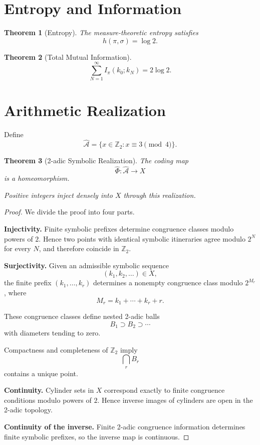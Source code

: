 \documentclass[11pt]{article}
\newtheorem{theorem}{Theorem}[section]
\begin{document}
\section{Entropy and Information}

\begin{theorem}[Entropy]
The measure-theoretic entropy satisfies
\[
h(\pi,\sigma)=\log2.
\]
\end{theorem}

\begin{theorem}[Total Mutual Information]
\[
\sum_{N=1}^\infty I_\pi(k_0;k_N)=2\log2.
\]
\end{theorem}

\section{Arithmetic Realization}

Define
\[
\widehat{\mathcal A}
=
\{x\in\mathbb Z_2:x\equiv3\pmod4\}.
\]

\begin{theorem}[2-adic Symbolic Realization]
The coding map
\[
\widehat\Phi:\widehat{\mathcal A}\to X
\]
is a homeomorphism.

Positive integers inject densely into \(X\) through this realization.
\end{theorem}

\begin{proof}
We divide the proof into four parts.

\textbf{Injectivity.}
Finite symbolic prefixes determine congruence classes modulo powers of \(2\).
Hence two points with identical symbolic itineraries agree modulo \(2^N\) for every \(N\),
and therefore coincide in \(\mathbb Z_2\).

\textbf{Surjectivity.}
Given an admissible symbolic sequence
\[
(k_1,k_2,\ldots)\in X,
\]
the finite prefix \((k_1,\ldots,k_r)\) determines a nonempty congruence class modulo
\(2^{M_r}\), where
\[
M_r=k_1+\cdots+k_r+r.
\]

These congruence classes define nested 2-adic balls
\[
B_1\supset B_2\supset\cdots
\]
with diameters tending to zero.

Compactness and completeness of \(\mathbb Z_2\) imply
\[
\bigcap_r B_r
\]
contains a unique point.

\textbf{Continuity.}
Cylinder sets in \(X\) correspond exactly to finite congruence conditions modulo powers
of \(2\). Hence inverse images of cylinders are open in the 2-adic topology.

\textbf{Continuity of the inverse.}
Finite 2-adic congruence information determines finite symbolic prefixes, so the inverse
map is continuous.
\end{proof}
\end{document}
